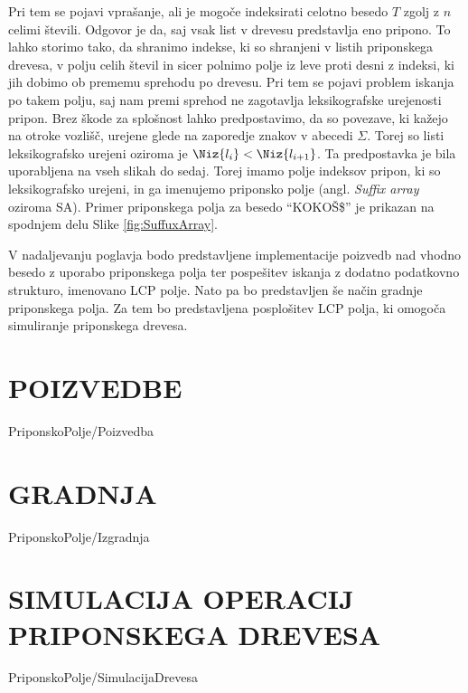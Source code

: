 Pri tem se pojavi vprašanje, ali je mogoče indeksirati celotno besedo $T$ zgolj z $n$ celimi števili. Odgovor je da, saj vsak list v drevesu predstavlja eno pripono. To lahko storimo tako, da shranimo indekse, ki so shranjeni v listih priponskega drevesa, v polju celih števil in sicer polnimo polje iz leve proti desni z indeksi, ki jih dobimo ob prememu sprehodu po drevesu. Pri tem se pojavi problem iskanja po takem polju, saj nam premi sprehod ne zagotavlja leksikografske urejenosti pripon. Brez škode za splošnost lahko predpostavimo, da so povezave, ki kažejo na otroke vozlišč, urejene glede na zaporedje znakov v abecedi $\Sigma$. Torej so listi leksikografsko urejeni oziroma je $\Niz{l_i}<\Niz{l_{i+1}}$. Ta predpostavka je bila uporabljena na vseh slikah do sedaj. Torej imamo polje indeksov pripon, ki so leksikografsko urejeni, in ga imenujemo priponsko polje (angl. \textit{Suffix array} oziroma SA). Primer priponskega polja za besedo \enquote{KOKOŠ\$} je prikazan na spodnjem delu Slike \ref{fig:SuffuxArray}. 

V nadaljevanju poglavja bodo predstavljene implementacije poizvedb nad vhodno besedo z uporabo priponskega polja ter pospešitev iskanja z dodatno podatkovno strukturo, imenovano LCP polje. Nato pa bo predstavljen še način gradnje priponskega polja. Za tem bo predstavljena posplošitev LCP polja, ki omogoča simuliranje priponskega drevesa. 


\section{POIZVEDBE}\label{sec:SAPoizvedbe}
{PriponskoPolje/Poizvedba}


\section{GRADNJA}\label{sec:SAIzgradnja}
{PriponskoPolje/Izgradnja}

\section{SIMULACIJA OPERACIJ PRIPONSKEGA DREVESA}\label{sec:STsimulacija}
{PriponskoPolje/SimulacijaDrevesa}